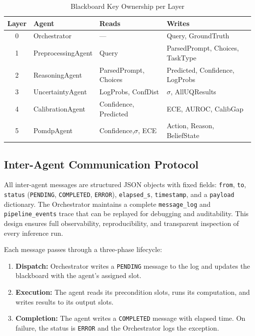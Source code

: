 \documentclass[conference]{IEEEtran}
\begin{document}
\begin{table}[htbp]
\footnotesize
\centering
\caption{Blackboard Key Ownership per Layer}
\label{tab:bb}
\renewcommand{\arraystretch}{1.15}

\begin{tabularx}{\columnwidth}{c l X X}
\toprule
\textbf{Layer} & \textbf{Agent} & \textbf{Reads} & \textbf{Writes} \\
\midrule

0 & Orchestrator
& ---
& Query, GroundTruth \\

1 & PreprocessingAgent
& Query
& ParsedPrompt, Choices, TaskType \\

2 & ReasoningAgent
& ParsedPrompt, Choices
& Predicted, Confidence, LogProbs \\

3 & UncertaintyAgent
& LogProbs, ConfDist
& $\sigma$, AllUQResults \\

4 & CalibrationAgent
& Confidence, Predicted
& ECE, AUROC, CalibGap \\

5 & PomdpAgent
& Confidence,$\sigma$, ECE
& Action, Reason, BeliefState \\

\bottomrule
\end{tabularx}
\end{table}

\subsection{Inter-Agent Communication Protocol}

All inter-agent messages are structured JSON objects with fixed
fields: \texttt{from}, \texttt{to}, \texttt{status}
(\texttt{PENDING}, \texttt{COMPLETED}, \texttt{ERROR}),
\texttt{elapsed\_s}, \texttt{timestamp}, and a
\texttt{payload} dictionary. The Orchestrator maintains a complete
\texttt{message\_log} and \texttt{pipeline\_events} trace that can
be replayed for debugging and auditability. This design ensures full
observability, reproducibility, and transparent inspection of every
inference run.

Each message passes through a three-phase lifecycle:
\begin{enumerate}[leftmargin=*]
    \item \textbf{Dispatch:} Orchestrator writes a \texttt{PENDING}
          message to the log and updates the blackboard with the
          agent's assigned slot.
    \item \textbf{Execution:} The agent reads its precondition slots,
          runs its computation, and writes results to its output slots.
    \item \textbf{Completion:} The agent writes a \texttt{COMPLETED}
          message with elapsed time. On failure, the status is
          \texttt{ERROR} and the Orchestrator logs the exception.
\end{enumerate}
\end{document}
